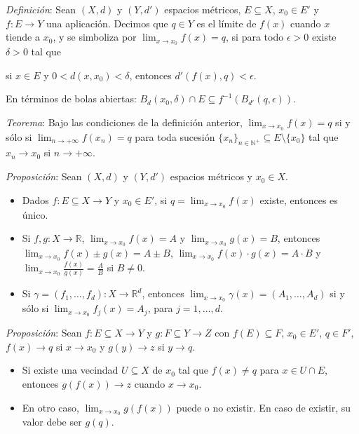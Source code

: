 \documentclass{beamer}
\begin{document}
  \begin{frame}
    \textit{Definición}: Sean $(X, d)$ y $(Y, d')$ espacios métricos, 
    $E \subseteq X$, $x_0 \in E'$ y $f: E \to Y$ una aplicación. Decimos 
    que $q \in Y$ es el límite de $f(x)$ cuando $x$ tiende a $x_0$, y se 
    simboliza por $\lim_{x \to x_0} f(x) = q$, si para todo $\epsilon > 0$ 
    existe $\delta > 0$ tal que
    \begin{center}
      si $x \in E$ y $0 < d(x, x_0) < \delta$, entonces $d'(f(x), q) < \epsilon$.
    \end{center}
    \pause

    En términos de bolas abiertas: $B_d(x_0, \delta) \cap E \subseteq 
    f^{-1}(B_{d'}(q, \epsilon))$.
  \end{frame}

  \begin{frame}
    \textit{Teorema}: Bajo las condiciones de la definición anterior,
    $\lim_{x \to x_0} f(x) = q$ si y sólo si $\lim_{n \to +\infty} f(x_n) = q$ 
    para toda sucesión $\{x_n\}_{n \in \mathbb{N}^+} \subseteq E \setminus \{x_0\}$ 
    tal que $x_n \to x_0$ si $n \to +\infty$.
  \end{frame}

  \begin{frame}
    \textit{Proposición}: Sean $(X, d)$ y $(Y, d')$ espacios métricos y $x_0 \in X$.
    \begin{itemize}[<+->]
      \item Dados $f: E \subseteq X \to Y$ y $x_0 \in E'$, si $q = \lim_{x \to x_0} f(x)$ 
      existe, entonces es único.
      \item Si $f, g: X \to \mathbb{R}$, $\lim_{x \to x_0} f(x) = A$ y 
      $\lim_{x \to x_0} g(x) = B$, entonces
      $\lim_{x \to x_0} f(x) \pm g(x) = A \pm B$, 
      $\lim_{x \to x_0} f(x) \cdot g(x) = A \cdot B$ y 
      $\lim_{x \to x_0} \frac{f(x)}{g(x)} = \frac{A}{B}$ si $B \neq 0$.
      \item Si $\gamma = (f_1, \ldots, f_d): X \to \mathbb{R}^d$, entonces 
      $\lim_{x \to x_0} \gamma(x) = (A_1, \ldots, A_d)$ si y sólo si 
      $\lim_{x \to x_0} f_j(x) = A_j$, para $j = 1, \ldots, d$.
    \end{itemize}
  \end{frame}

  \begin{frame}
    \textit{Proposición}: Sean $f: E \subseteq X \to Y$ y $g: F \subseteq Y \to Z$ 
    con $f(E) \subseteq F$, $x_0 \in E'$, $q \in F'$, $f(x) \to q$ si $x \to x_0$ 
    y $g(y) \to z$ si $y \to q$.
    \pause
    \begin{itemize}[<+->]
      \item Si existe una vecindad $U \subseteq X$ de $x_0$ tal que $f(x) \neq q$ 
      para $x \in U \cap E$, entonces $g(f(x)) \to z$ cuando $x \to x_0$.
      \item En otro caso, $\lim_{x \to x_0} g(f(x))$ puede o no existir. En caso 
      de existir, su valor debe ser $g(q)$.
    \end{itemize}
  \end{frame}
\end{document}
